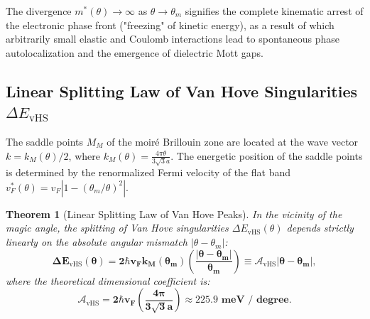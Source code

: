 \documentclass[12pt,a4paper]{article}
\newtheorem{theorem}{Theorem}
\begin{document}
		The divergence $m^*(\theta) \to \infty$ as $\theta \to \theta_m$ signifies the complete kinematic arrest of the electronic phase front ("freezing" of kinetic energy), as a result of which arbitrarily small elastic and Coulomb interactions lead to spontaneous phase autolocalization and the emergence of dielectric Mott gaps.
		
		\subsection{Linear Splitting Law of Van Hove Singularities $\Delta E_{\text{vHS}}$}
		The saddle points $M_M$ of the moiré Brillouin zone are located at the wave vector $k = k_M(\theta)/2$, where $k_M(\theta) = \frac{4\pi \theta}{3\sqrt{3} a}$. The energetic position of the saddle points is determined by the renormalized Fermi velocity of the flat band $v_F^*(\theta) = v_F \left| 1 - (\theta_m/\theta)^2 \right|$.
		
\begin{theorem}[Linear Splitting Law of Van Hove Peaks]
	In the vicinity of the magic angle, the splitting of Van Hove singularities $\Delta E_{\mathrm{vHS}}(\theta)$ depends strictly linearly on the absolute angular mismatch $|\theta - \theta_m|$:
	\begin{equation}
	\mathbf{\Delta E_{\mathrm{vHS}}(\theta) = 2 \hbar v_F k_M(\theta_m) \left( \frac{|\theta - \theta_m|}{\theta_m} \right) \equiv \mathcal{A}_{\mathrm{vHS}} |\theta - \theta_m|},
	\end{equation}
where the theoretical dimensional coefficient is:
	\begin{equation}
	\mathbf{\mathcal{A}_{\mathrm{vHS}} = 2 \hbar v_F \left( \frac{4\pi}{3\sqrt{3} a} \right) \approx \mathbf{225.9\text{ meV / degree}}}.
	\end{equation}
\end{theorem}
			
\end{document}
